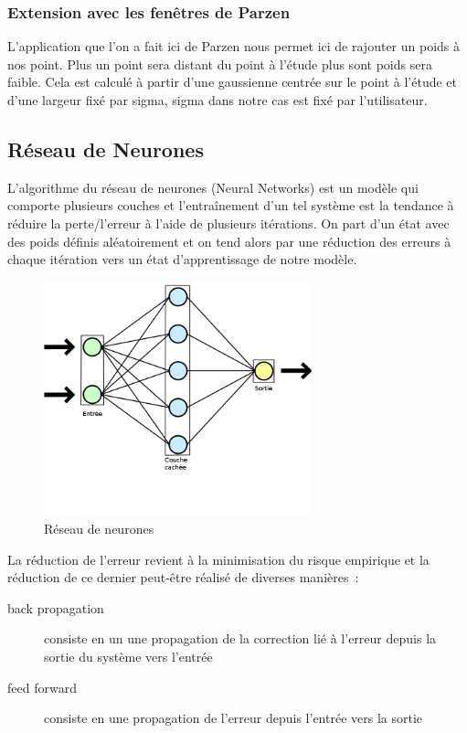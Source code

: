 \documentclass[a4paper,10pt,twocolumn]{extarticle}
\begin{document}
\subsubsection{Extension avec les fenêtres de Parzen}
L'application que l'on a fait ici de Parzen nous permet ici de rajouter un poids à nos point. Plus un point sera distant du point à l'étude plus sont poids sera faible. Cela est calculé à partir d'une gaussienne centrée sur le point à l'étude et d'une largeur fixé par sigma, sigma dans notre cas est fixé par l'utilisateur.

\subsection{Réseau de Neurones}
L'algorithme du réseau de neurones (Neural Networks) est un modèle qui comporte plusieurs couches et l'entraînement d'un tel système est la tendance à réduire la perte/l'erreur à l'aide de plusieurs itérations. On part d'un état avec des poids définis aléatoirement et on tend alors par une réduction des erreurs à chaque itération vers un état d'apprentissage de notre modèle.
\begin{figure}[H]
  \begin{center}
    \includegraphics[width=220pt]{images_rapport/Neural_network.png}
    \caption{Réseau de neurones}
    \label{fig:nnet}
  \end{center}
\end{figure}
La réduction de l'erreur revient à la minimisation du risque empirique et la réduction de ce dernier peut-être réalisé de diverses manières :
\begin{description}
  \item[back propagation] consiste en un une propagation de la correction lié à l'erreur depuis la sortie du système vers l'entrée
  \item[feed forward] consiste en une propagation de l'erreur depuis l'entrée vers la sortie
\end{description}
\end{document}
